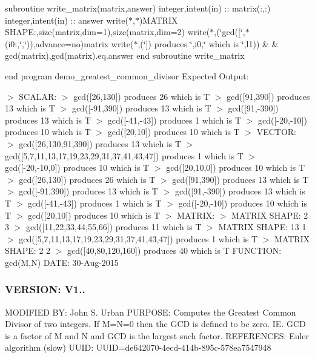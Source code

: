 subroutine write\+\_\+matrix(matrix,answer) integer,intent(in) \+:\+: matrix(\+:,\+:) integer,intent(in) \+:\+: answer write($\ast$,$\ast$)\textquotesingle{}M\+A\+T\+R\+IX S\+H\+A\+PE\+:\textquotesingle{},size(matrix,dim=1),size(matrix,dim=2) write($\ast$,\textquotesingle{}(\char`\"{}gcd(\mbox{[}\char`\"{},$\ast$(i0\+:,\char`\"{},\char`\"{}))\textquotesingle{},advance=\textquotesingle{}no\textquotesingle{})matrix write($\ast$,\textquotesingle{}(\char`\"{}\mbox{]}) produces \char`\"{},i0,\char`\"{} which is \char`\"{},l1)\textquotesingle{}) \& \& gcd(matrix),gcd(matrix).eq.\+answer end subroutine write\+\_\+matrix

end program demo\+\_\+greatest\+\_\+common\+\_\+divisor Expected Output\+:

$>$ S\+C\+A\+L\+AR\+: $>$ gcd(\mbox{[}26,130\mbox{]}) produces 26 which is T $>$ gcd(\mbox{[}91,390\mbox{]}) produces 13 which is T $>$ gcd(\mbox{[}-\/91,390\mbox{]}) produces 13 which is T $>$ gcd(\mbox{[}91,-\/390\mbox{]}) produces 13 which is T $>$ gcd(\mbox{[}-\/41,-\/43\mbox{]}) produces 1 which is T $>$ gcd(\mbox{[}-\/20,-\/10\mbox{]}) produces 10 which is T $>$ gcd(\mbox{[}20,10\mbox{]}) produces 10 which is T $>$ V\+E\+C\+T\+OR\+: $>$ gcd(\mbox{[}26,130,91,390\mbox{]}) produces 13 which is T $>$ gcd(\mbox{[}5,7,11,13,17,19,23,29,31,37,41,43,47\mbox{]}) produces 1 which is T $>$ gcd(\mbox{[}-\/20,-\/10,0\mbox{]}) produces 10 which is T $>$ gcd(\mbox{[}20,10,0\mbox{]}) produces 10 which is T $>$ gcd(\mbox{[}26,130\mbox{]}) produces 26 which is T $>$ gcd(\mbox{[}91,390\mbox{]}) produces 13 which is T $>$ gcd(\mbox{[}-\/91,390\mbox{]}) produces 13 which is T $>$ gcd(\mbox{[}91,-\/390\mbox{]}) produces 13 which is T $>$ gcd(\mbox{[}-\/41,-\/43\mbox{]}) produces 1 which is T $>$ gcd(\mbox{[}-\/20,-\/10\mbox{]}) produces 10 which is T $>$ gcd(\mbox{[}20,10\mbox{]}) produces 10 which is T $>$ M\+A\+T\+R\+IX\+: $>$ M\+A\+T\+R\+IX S\+H\+A\+PE\+: 2 3 $>$ gcd(\mbox{[}11,22,33,44,55,66\mbox{]}) produces 11 which is T $>$ M\+A\+T\+R\+IX S\+H\+A\+PE\+: 13 1 $>$ gcd(\mbox{[}5,7,11,13,17,19,23,29,31,37,41,43,47\mbox{]}) produces 1 which is T $>$ M\+A\+T\+R\+IX S\+H\+A\+PE\+: 2 2 $>$ gcd(\mbox{[}40,80,120,160\mbox{]}) produces 40 which is T F\+U\+N\+C\+T\+I\+ON\+: gcd(\+M,\+N) D\+A\+TE\+: 30-\/\+Aug-\/2015 \subsubsection*{V\+E\+R\+S\+I\+ON\+: V1..}

M\+O\+D\+I\+F\+I\+ED BY\+: John S. Urban P\+U\+R\+P\+O\+SE\+: Computes the Greatest Common Divisor of two integers. If M=N=0 then the G\+CD is defined to be zero. IE. G\+CD is a factor of M and N and G\+CD is the largest such factor. R\+E\+F\+E\+R\+E\+N\+C\+ES\+: Euler algorithm (slow) U\+U\+ID\+: U\+U\+ID=de642070-\/4ecd-\/414b-\/895c-\/578ea7547948 \mbox{\label{interfacem__factor_1_1greatest__common__divisor_a97be1fa43fb41e5e96ee3bbe2f9e6dd5}} 
